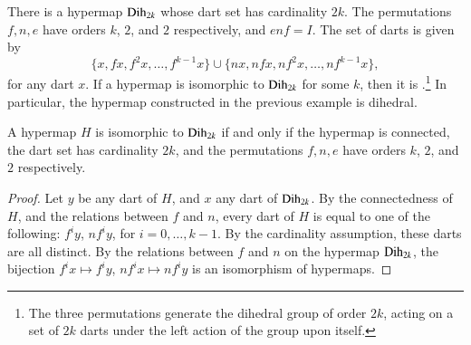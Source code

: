 \begin{example}[dihedral]\label{ex:D2k} 
There is a hypermap ${\operatorname{Dih}}_{2k}$ whose dart set has cardinality $2k$.
The permutations $f,n,e$ have  orders $k$, $2$, and $2$ respectively, and 
$e n f = I$.
The set of darts is given by
\begin{displaymath}
\{x, f x,f^2 x,\ldots,f^{k-1} x\}\cup \{n x, n f x, n f^2 x,\ldots, n f^{k-1} x\},
\end{displaymath}
for any dart $x$.
If a hypermap is isomorphic to ${\operatorname{Dih}}_{2k}$ for
some $k$, then it is .\footnote{The three permutations generate the dihedral
group of order $2k$, acting on a set of $2k$ darts under the left action of the group upon itself.}   
In particular,
the hypermap constructed in the previous example is dihedral.
%
\end{example}

\begin{lemma}\label{lemma:dih-iso}
A hypermap $H$ is isomorphic to ${\operatorname{Dih}}_{2k}$ if and only if the hypermap is connected,
the dart set has cardinality $2k$, and the permutations $f,n,e$ have orders $k$, $2$, and $2$ respectively.
\end{lemma}

\begin{proof} Let $y$ be any dart of $H$, and $x$ any dart of ${\operatorname{Dih}}_{2k}$.
By the connectedness of $H$, and the relations between $f$ and $n$, every dart of $H$ is
equal to one of the following: $f^i y$, $n f^i y$, for $i=0,\ldots,k-1$.  By the cardinality assumption,
these darts are all distinct.  By the relations between $f$ and $n$ on the hypermap ${\operatorname{Dih}}_{2k}$,
the bijection $f^i x \mapsto f^i y$, $n f^i x \mapsto n f^i y$ is an isomorphism of hypermaps.
\end{proof}

